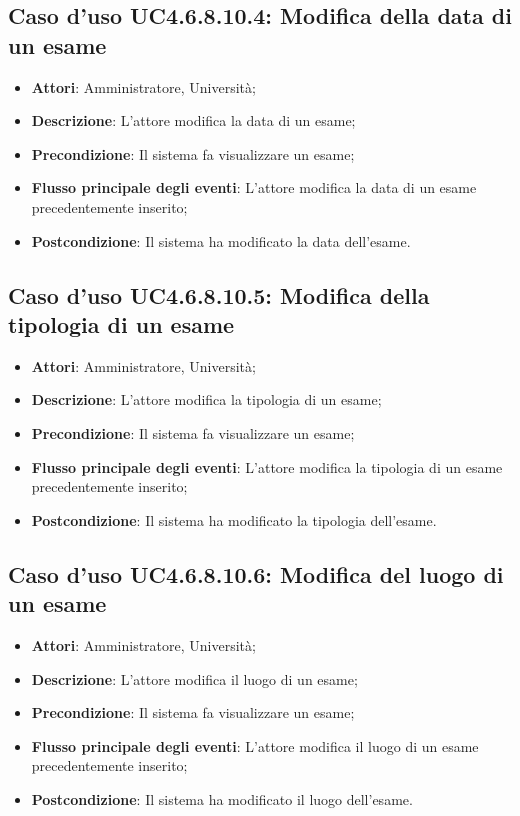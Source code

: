 \subsection{Caso d'uso \texorpdfstring{UC4.6.8.10.4}{UC4.6.8.10.4}: Modifica della data di un esame}
\begin{itemize}
	\item \textbf{Attori}: Amministratore, Università;
	\item \textbf{Descrizione}: L'attore modifica la data di un esame;
	
	\item \textbf{Precondizione}: Il sistema fa visualizzare un esame;
	
	\item \textbf{Flusso principale degli eventi}: L'attore modifica la data di un esame precedentemente inserito;
	
	\item \textbf{Postcondizione}: Il sistema ha modificato la data dell'esame.
	
\end{itemize}
\subsection{Caso d'uso \texorpdfstring{UC4.6.8.10.5}{UC4.6.8.10.5}: Modifica della tipologia di un esame}
\begin{itemize}
	\item \textbf{Attori}: Amministratore, Università;
	\item \textbf{Descrizione}: L'attore modifica la tipologia di un esame;
	
	\item \textbf{Precondizione}: Il sistema fa visualizzare un esame;
	
	\item \textbf{Flusso principale degli eventi}: L'attore modifica la tipologia di un esame precedentemente inserito;
	
	\item \textbf{Postcondizione}: Il sistema ha modificato la tipologia dell’esame.
	
\end{itemize}
\subsection{Caso d'uso \texorpdfstring{UC4.6.8.10.6}{UC4.6.8.10.6}: Modifica del luogo di un esame}
\begin{itemize}
	\item \textbf{Attori}: Amministratore, Università;
	\item \textbf{Descrizione}: L'attore modifica il luogo di un esame;
	
	\item \textbf{Precondizione}: Il sistema fa visualizzare un esame;
	
	\item \textbf{Flusso principale degli eventi}: L'attore modifica il luogo di un esame precedentemente inserito;
	
	\item \textbf{Postcondizione}: Il sistema ha modificato il luogo dell'esame.
	
\end{itemize}

